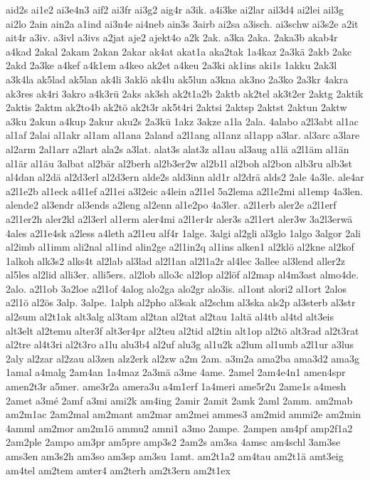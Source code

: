 {aid2s
ai1e2
ai3e4n3
aif2
ai3fr
ai3g2
aig4r
a3ik.
a4i3ke
ai2lar
ail3d4
ai2lei
ail3g
ai2lo
2ain
ain2a
a1ind
ai3n4e
ai4neb
ain3s
3airb
ai2sa
a3isch.
ai3schw
ai3s2e
a2it
ait4r
a3iv.
a3ivl
a3ivs
a2jat
aje2
ajekt4o
a2k
2ak.
a3ka
2aka.
2aka3b
akab4r
a4kad
2akal
2akam
2akan
2akar
ak4at
akat1a
aka2tak
1a4kaz
2a3kä
2akb
2akc
2akd
2a3ke
a4kef
a4k1em
a4keo
ak2et
a4keu
2a3ki
ak1ins
aki1s
1akku
2ak3l
a3k4la
ak5lad
ak5lan
ak4li
3aklö
ak4lu
ak5lun
a3kna
ak3no
2a3ko
2a3kr
4akra
ak3res
ak4ri
3akro
a4k3rü
2aks
ak3sh
ak2t1a2b
2aktb
ak2tel
ak3t2er
2aktg
2aktik
2aktis
2aktm
ak2to4b
ak2tö
ak2t3r
ak5t4ri
2aktsi
2aktsp
2aktst
2aktun
2aktw
a3ku
2akun
a4kup
2akur
aku2s
2a3kü
1akz
3akze
a1la
2ala.
4alabo
a2l3abt
al1ac
al1af
2alai
al1akr
al1am
al1ana
2aland
a2l1ang
al1anz
al1app
a3lar.
al3arc
a3lare
al2arm
2al1arr
a2lart
ala2s
a3lat.
alat3s
alat3z
al1au
al3aug
a1lä
a2l1äm
al1än
al1är
al1äu
3albat
al2bär
al2berh
al2b3er2w
al2b1l
al2boh
al2bon
alb3ru
alb3st
al4dan
al2dä
al2d3erl
al2d3ern
alde2s
ald3inn
ald1r
al2drä
alds2
2ale
4a3le.
ale4ar
a2l1e2b
al1eck
a4l1ef
a2l1ei
a3l2eic
a4lein
a2l1el
5a2lema
a2l1e2mi
al1emp
4a3len.
alende2
al3endr
al3ends
a2leng
al2enn
al1e2po
4a3ler.
a2l1erb
aler2e
a2l1erf
a2l1er2h
aler2kl
a2l3erl
al1erm
aler4mi
a2l1er4r
aler3s
a2l1ert
aler3w
3a2l3erwä
4ales
a2l1e4sk
a2less
a4leth
a2l1eu
alf4r
1alge.
3algi
al2gli
al3glo
1algo
3algor
2ali
al2imb
al1imm
ali2nal
al1ind
alin2ge
a2l1in2q
al1ins
alken1
al2klö
al2kne
al2kof
1alkoh
alk3s2
alks4t
al2lab
al3lad
al2l1an
al2l1a2r
al4lec
3allee
al3lend
aller2z
al5les
al2lid
alli3er.
alli5ers.
al2lob
allo3c
al2lop
al2löf
al2map
al4m3ast
almo4de.
2alo.
a2l1ob
3a2loe
a2l1of
4alog
alo2ga
alo2gr
alo3is.
al1ont
alori2
al1ort
2alos
a2l1ö
al2ös
3alp.
3alpe.
1alph
al2pho
al3sak
al2schm
al3ska
als2p
al3sterb
al3str
al2sum
al2t1ak
alt3alg
al3tam
al2tan
al2tat
al2tau
1altä
al4tb
al4td
alt3eis
alt3elt
al2temu
alter3f
alt3er4pr
al2teu
al2tid
al2tin
alt1op
al2tö
alt3rad
al2t3rat
al2tre
al4t3ri
al2t3ro
a1lu
alu3b4
al2uf
alu3g
al1u2k
a2lum
al1umb
a2l1ur
a3lus
2aly
al2zar
al2zau
al3zen
alz2erk
al2zw
a2m
2am.
a3m2a
ama2ba
ama3d2
ama3g
1amal
a4malg
2am4an
1a4maz
2a3mä
a3me
4ame.
2amel
2am4e4n1
amen4spr
amen2t3r
a5mer.
ame3r2a
amera3u
a4m1erf
1a4meri
ame5r2u
2ame1s
a4mesh
2amet
a3mé
2amf
a3mi
ami2k
am4ing
2amir
2amit
2amk
2aml
2amm.
am2mab
am2m1ac
2am2mal
am2mant
am2mar
am2mei
ammes3
am2mid
ammi2e
am2min
4amml
am2mor
am2m1ö
ammu2
amni1
a3mo
2ampe.
2ampen
am4pf
amp2f1a2
2am2ple
2ampo
am3pr
am5pre
amp3s2
2am2s
am3sa
4amsc
am4schl
3am3se
ams3en
am3s2h
am3so
am3sp
am3su
1amt.
am2t1a2
am4tau
am2t1ä
amt3eig
am4tel
am2tem
amter4
am2terh
am2t3ern
am2t1ex
}

